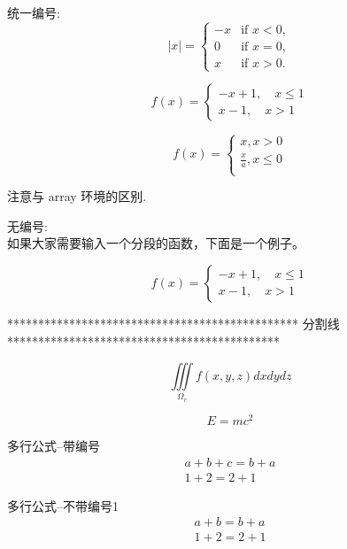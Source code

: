 \documentclass[UTF8]{ctexart}
\begin{document}
统一编号:\\

\begin{equation} |x| =
\begin{cases}
-x & \mbox{if } x < 0,\\
0 & \mbox{if } x = 0,\\
x & \mbox{if } x > 0.
\end{cases}
\end{equation}

\begin{equation}
f(x) = 
\begin{cases}
-x + 1, \quad x \leq 1\\
x - 1, \quad x > 1
\end{cases}
\end{equation}

\begin{equation}
f(x) = \left\{
\begin{aligned}
x, x > 0 \\
\frac{x}{a}, x \leqslant 0 \\
\end{aligned}
\right.
\end{equation}

注意与 array 环境的区别.


无编号:\\
如果大家需要输入一个分段的函数，下面是一个例子。

\[ f(x)=
\begin{cases}
-x +1
,\quad x \leq 1\\
x -1,\quad x >1
\end{cases}
\]


*********************************************** 分割线 ********************************************


	\[
	\iiint\limits_{\Omega_{r}}f(x,y,z)dxdydz
	\]

\begin{equation} \label{eq1}
	E = mc^2
\end{equation}


多行公式--带编号
\begin{gather}
a + b +c = b + a \\
1+2 = 2 + 1
\end{gather}

多行公式--不带编号1
\begin{gather*}
a + b = b + a \\
1+2 = 2 + 1
\end{gather*}
\end{document}
